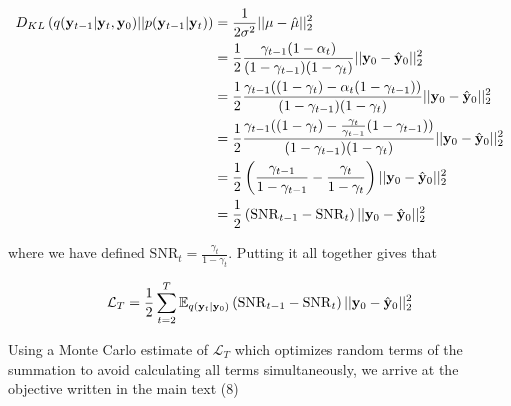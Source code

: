 \begin{align*}
D_{KL}\left(q(\bold{y}_{t-1}\lvert\bold{y}_t,\bold{y}_0)\lvert\lvert p(\bold{y}_{t-1}\lvert\bold{y}_t) \right) &= \frac{1}{2\sigma^{2}} \lvert\lvert \mu - \hat{\mu} \lvert\lvert_{2}^{2} \\
&= \frac{1}{2}\frac{\gamma_{t-1}(1-\alpha_{t})}{(1-\gamma_{t-1})(1-\gamma_{t})}\lvert\lvert \bold{y}_{0} - \hat{\bold{y}}_{0} \lvert\lvert_{2}^{2}\\
&= \frac{1}{2}\frac{\gamma_{t-1}((1-\gamma_{t})-\alpha_{t}(1-\gamma_{t-1}))}{(1-\gamma_{t-1})(1-\gamma_{t})}\lvert\lvert \bold{y}_{0} - \hat{\bold{y}}_{0} \lvert\lvert_{2}^{2}\\
&= \frac{1}{2}\frac{\gamma_{t-1}((1-\gamma_{t})-\frac{\gamma_{t}}{\gamma_{t-1}}(1-\gamma_{t-1}))}{(1-\gamma_{t-1})(1-\gamma_{t})}\lvert\lvert \bold{y}_{0} - \hat{\bold{y}}_{0} \lvert\lvert_{2}^{2}\\
&= \frac{1}{2}\left(\frac{\gamma_{t-1}}{1-\gamma_{t-1}}-\frac{\gamma_{t}}{1-\gamma_{t}}\right)\lvert\lvert \bold{y}_{0} - \hat{\bold{y}}_{0} \lvert\lvert_{2}^{2}\\
&= \frac{1}{2}\left(\mathrm{SNR}_{t-1}-\mathrm{SNR}_{t}\right)\lvert\lvert \bold{y}_{0} - \hat{\bold{y}}_{0} \lvert\lvert_{2}^{2}
\end{align*}



where we have defined $\mathrm{SNR}_{t} = \frac{\gamma_{t}}{1-\gamma_{t}}$. Putting it all together gives that 

\begin{equation}
\mathcal{L}_{T} = \frac{1}{2}\sum_{t=2}^{T} \mathbb{E}_{q(\bold{y}_{t}\lvert\bold{y}_{0})}\left(\mathrm{SNR}_{t-1}-\mathrm{SNR}_{t}\right)\lvert\lvert \bold{y}_{0} - \hat{\bold{y}}_{0} \lvert\lvert_{2}^{2}
\end{equation}

Using a Monte Carlo estimate of $\mathcal{L}_{T}$ \parencite{Kingma2023} which optimizes random terms of the summation to avoid calculating all terms simultaneously, we arrive at the objective written in the main text (8)

